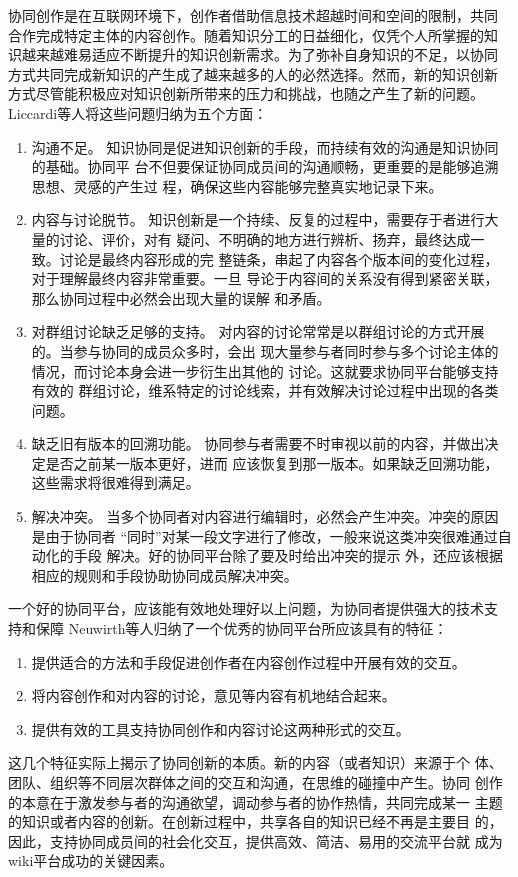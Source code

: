 协同创作是在互联网环境下，创作者借助信息技术超越时间和空间的限制，共同
合作完成特定主体的内容创作。随着知识分工的日益细化，仅凭个人所掌握的知
识越来越难易适应不断提升的知识创新需求。为了弥补自身知识的不足，以协同
方式共同完成新知识的产生成了越来越多的人的必然选择。然而，新的知识创新
方式尽管能积极应对知识创新所带来的压力和挑战，也随之产生了新的问题。
Liccardi等人将这些问题归纳为五个方面\cite{liccardi2007caws}：
\begin{enumerate}
\item 沟通不足。
知识协同是促进知识创新的手段，而持续有效的沟通是知识协同的基础。协同平
台不但要保证协同成员间的沟通顺畅，更重要的是能够追溯思想、灵感的产生过
程，确保这些内容能够完整真实地记录下来。
\item 内容与讨论脱节。
知识创新是一个持续、反复的过程中，需要存于者进行大量的讨论、评价，对有
疑问、不明确的地方进行辨析、扬弃，最终达成一致。讨论是最终内容形成的完
整链条，串起了内容各个版本间的变化过程，对于理解最终内容非常重要。一旦
导论于内容间的关系没有得到紧密关联，那么协同过程中必然会出现大量的误解
和矛盾。
\item 对群组讨论缺乏足够的支持。
对内容的讨论常常是以群组讨论的方式开展的。当参与协同的成员众多时，会出
现大量参与者同时参与多个讨论主体的情况，而讨论本身会进一步衍生出其他的
讨论。这就要求协同平台能够支持有效的
群组讨论，维系特定的讨论线索，并有效解决讨论过程中出现的各类问题。
\item 缺乏旧有版本的回溯功能。
协同参与者需要不时审视以前的内容，并做出决定是否之前某一版本更好，进而
应该恢复到那一版本。如果缺乏回溯功能，这些需求将很难得到满足。
\item 解决冲突。
 当多个协同者对内容进行编辑时，必然会产生冲突。冲突的原因是由于协同者
 “同时”对某一段文字进行了修改，一般来说这类冲突很难通过自动化的手段
 解决。好的协同平台除了要及时给出冲突的提示
 外，还应该根据相应的规则和手段协助协同成员解决冲突。
\end{enumerate}

一个好的协同平台，应该能有效地处理好以上问题，为协同者提供强大的技术支
持和保障
Neuwirth等人归纳了一个优秀的协同平台所应该具有的特征：
\begin{enumerate}
\item 提供适合的方法和手段促进创作者在内容创作过程中开展有效的交互。
\item 将内容创作和对内容的讨论，意见等内容有机地结合起来。
\item 提供有效的工具支持协同创作和内容讨论这两种形式的交互。
\end{enumerate}
这几个特征实际上揭示了协同创新的本质。新的内容（或者知识）来源于个
体、团队、组织等不同层次群体之间的交互和沟通，在思维的碰撞中产生。协同
创作的本意在于激发参与者的沟通欲望，调动参与者的协作热情，共同完成某一
主题的知识或者内容的创新。在创新过程中，共享各自的知识已经不再是主要目
的，因此，支持协同成员间的社会化交互，提供高效、简洁、易用的交流平台就
成为wiki平台成功的关键因素。


